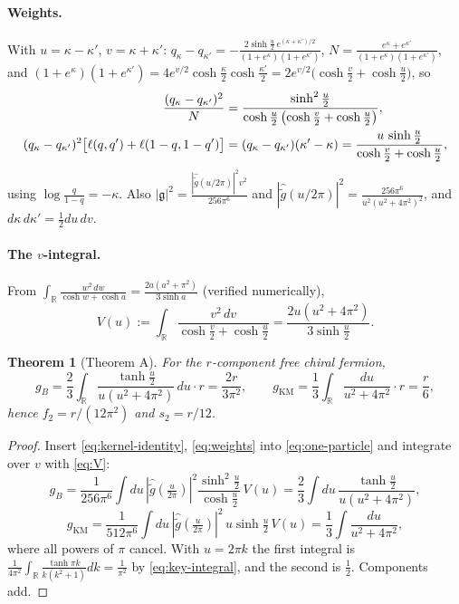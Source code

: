 \documentclass[11pt]{article}
\theoremstyle{accent}
\newtheorem{theorem}{Theorem}[section]
\theoremstyle{definition}
\newcommand{\gh}{\widehat{\widetilde g}}
\begin{document}
\paragraph{Weights.}
With \(u=\kappa-\kappa'\), \(v=\kappa+\kappa'\): \(q_\kappa-q_{\kappa'}=-\frac{2\sinh\frac u2\,e^{(\kappa+\kappa')/2}}{(1+e^\kappa)(1+e^{\kappa'})}\), \(N=\frac{e^\kappa+e^{\kappa'}}{(1+e^\kappa)(1+e^{\kappa'})}\), and \((1+e^\kappa)(1+e^{\kappa'})=4e^{v/2}\cosh\frac\kappa2\cosh\frac{\kappa'}2=2e^{v/2}\bigl(\cosh\frac v2+\cosh\frac u2\bigr)\), so
\begin{align}
 \frac{(q_\kappa-q_{\kappa'})^2}{N}&=\frac{\sinh^2\frac u2}{\cosh\frac u2\,\bigl(\cosh\frac v2+\cosh\frac u2\bigr)},\label{eq:weights}\\
 (q_\kappa-q_{\kappa'})^2\bigl[\ell(q,q')+\ell(1-q,1-q')\bigr]&=(q_\kappa-q_{\kappa'})(\kappa'-\kappa)=\frac{u\,\sinh\frac u2}{\cosh\frac v2+\cosh\frac u2},\notag
\end{align}
using \(\log\frac{q}{1-q}=-\kappa\).  Also \(|\mathfrak g|^2=\frac{|\gh(u/2\pi)|^2v^2}{256\pi^6}\) and \(|\gh(u/2\pi)|^2=\frac{256\pi^6}{u^2(u^2+4\pi^2)^2}\), and \(d\kappa\,d\kappa'=\frac12du\,dv\).

\paragraph{The \(v\)-integral.}
From \(\int_{\mathbb R}\frac{w^2\,dw}{\cosh w+\cosh a}=\frac{2a(a^2+\pi^2)}{3\sinh a}\) (verified numerically),
\begin{equation}\label{eq:V}
 V(u):=\int_{\mathbb R}\frac{v^2\,dv}{\cosh\frac v2+\cosh\frac u2}=\frac{2u(u^2+4\pi^2)}{3\sinh\frac u2}.
\end{equation}

\begin{theorem}[Theorem A]\label{thm:A}
For the \(r\)-component free chiral fermion,
\[
 g_B=\frac23\int_{\mathbb R}\frac{\tanh\frac u2}{u(u^2+4\pi^2)}\,du\cdot r=\frac{2r}{3\pi^2},\qquad
 g_{\mathrm{KM}}=\frac13\int_{\mathbb R}\frac{du}{u^2+4\pi^2}\cdot r=\frac r6,
\]
hence \(f_2=r/(12\pi^2)\) and \(s_2=r/12\).
\end{theorem}
\begin{proof}
Insert \eqref{eq:kernel-identity}, \eqref{eq:weights} into \eqref{eq:one-particle} and integrate over \(v\) with \eqref{eq:V}:
\[
 g_B=\frac{1}{256\pi^6}\int du\,|\gh(\tfrac u{2\pi})|^2\frac{\sinh^2\frac u2}{\cosh\frac u2}\,V(u)
 =\frac23\int du\,\frac{\tanh\frac u2}{u(u^2+4\pi^2)},
\]
\[
 g_{\mathrm{KM}}=\frac{1}{512\pi^6}\int du\,|\gh(\tfrac u{2\pi})|^2\,u\sinh\tfrac u2\,V(u)=\frac13\int\frac{du}{u^2+4\pi^2},
\]
where all powers of \(\pi\) cancel.  With \(u=2\pi k\) the first integral is \(\frac{1}{4\pi^2}\int_{\mathbb R}\frac{\tanh\pi k}{k(k^2+1)}dk=\frac{1}{\pi^2}\) by \eqref{eq:key-integral}, and the second is \(\frac1{2}\).  Components add.
\end{proof}
\end{document}
